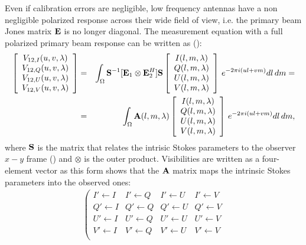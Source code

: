 \begin{itemize}
Even if calibration errors are negligible, low frequency antennas have a non negligible polarized response across their wide field of view, i.e. the primary beam Jones matrix ${\bf E}$ is no longer diagonal. The measurement equation with a full polarized primary beam response can be written as (\cite{nunhokee17}):
\begin{eqnarray}
    \left[ 
    \begin{array}{cc}
    V_{12,I} (u,v,\lambda)\\
    V_{12,Q} (u,v,\lambda)\\
    V_{12,U} (u,v,\lambda)\\
    V_{12,V} (u,v,\lambda)
    \end{array}
    \right] & = & \int_\Omega{ {\bf S}^{-1} [ {\bf E}_1 \otimes {\bf E}_2^H ] {\bf S} 
    \left[ 
    \begin{array}{cc}
    I (l,m,\lambda)\\
    Q (l,m,\lambda)\\
    U (l,m,\lambda)\\
    V (l,m,\lambda)
    \end{array}
    \right]
     \, e^{-2 \pi i (ul + vm)} dl \, dm } = \nonumber \\
     & = & \int_\Omega{ {\bf A} (l,m,\lambda) 
    \left[ 
    \begin{array}{cc}
    I (l,m,\lambda)\\
    Q (l,m,\lambda)\\
    U (l,m,\lambda)\\
    V (l,m,\lambda)
    \end{array}
    \right]
     \, e^{-2 \pi i (ul + vm)} dl \, dm },
\label{eq:sec:8}
\end{eqnarray} 
where ${\bf S}$ is the matrix that relates the intrisic Stokes parameters to the observer $x-y$ frame (\cite{hamaker96}) and $\otimes$ is the outer product. Visibilities are written as a four-element vector as this form shows that the ${\bf A}$ matrix maps the intrinsic Stokes parameters into the observed ones: 
\begin{eqnarray}
    \left(
    \begin{array}{cccc}
    I' \leftarrow I & I' \leftarrow Q & I' \leftarrow U & I' \leftarrow V \\
    Q' \leftarrow I & Q' \leftarrow Q & Q' \leftarrow U & Q' \leftarrow V \\
    U' \leftarrow I & U' \leftarrow Q & U' \leftarrow U & U' \leftarrow V \\
    V' \leftarrow I & V' \leftarrow Q & V' \leftarrow U & V' \leftarrow V \\

\end{array}
\end{eqnarray}
\end{itemize}

